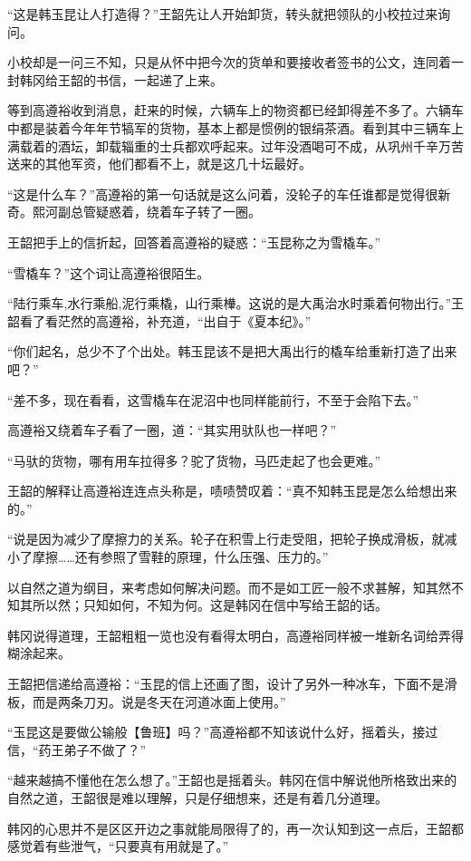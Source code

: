 “这是韩玉昆让人打造得？”王韶先让人开始卸货，转头就把领队的小校拉过来询问。

小校却是一问三不知，只是从怀中把今次的货单和要接收者签书的公文，连同着一封韩冈给王韶的书信，一起递了上来。

等到高遵裕收到消息，赶来的时候，六辆车上的物资都已经卸得差不多了。六辆车中都是装着今年年节犒军的货物，基本上都是惯例的银绢茶酒。看到其中三辆车上满载着的酒坛，卸载辎重的士兵都欢呼起来。过年没酒喝可不成，从巩州千辛万苦送来的其他军资，他们都看不上，就是这几十坛最好。

“这是什么车？”高遵裕的第一句话就是这么问着，没轮子的车任谁都是觉得很新奇。熙河副总管疑惑着，绕着车子转了一圈。

王韶把手上的信折起，回答着高遵裕的疑惑：“玉昆称之为雪橇车。”

“雪橇车？”这个词让高遵裕很陌生。

“陆行乘车,水行乘船,泥行乘橇，山行乘檋。这说的是大禹治水时乘着何物出行。”王韶看了看茫然的高遵裕，补充道，“出自于《夏本纪》。”

“你们起名，总少不了个出处。韩玉昆该不是把大禹出行的橇车给重新打造了出来吧？”

“差不多，现在看看，这雪橇车在泥沼中也同样能前行，不至于会陷下去。”

高遵裕又绕着车子看了一圈，道：“其实用驮队也一样吧？”

“马驮的货物，哪有用车拉得多？驼了货物，马匹走起了也会更难。”

王韶的解释让高遵裕连连点头称是，啧啧赞叹着：“真不知韩玉昆是怎么给想出来的。”

“说是因为减少了摩擦力的关系。轮子在积雪上行走受阻，把轮子换成滑板，就减小了摩擦……还有参照了雪鞋的原理，什么压强、压力的。”

以自然之道为纲目，来考虑如何解决问题。而不是如工匠一般不求甚解，知其然不知其所以然；只知如何，不知为何。这是韩冈在信中写给王韶的话。

韩冈说得道理，王韶粗粗一览也没有看得太明白，高遵裕同样被一堆新名词给弄得糊涂起来。

王韶把信递给高遵裕：“玉昆的信上还画了图，设计了另外一种冰车，下面不是滑板，而是两条刀刃。说是冬天在河道冰面上使用。”

“玉昆这是要做公输般【鲁班】吗？”高遵裕都不知该说什么好，摇着头，接过信，“药王弟子不做了？”

“越来越搞不懂他在怎么想了。”王韶也是摇着头。韩冈在信中解说他所格致出来的自然之道，王韶很是难以理解，只是仔细想来，还是有着几分道理。

韩冈的心思并不是区区开边之事就能局限得了的，再一次认知到这一点后，王韶都感觉着有些泄气，“只要真有用就是了。”

